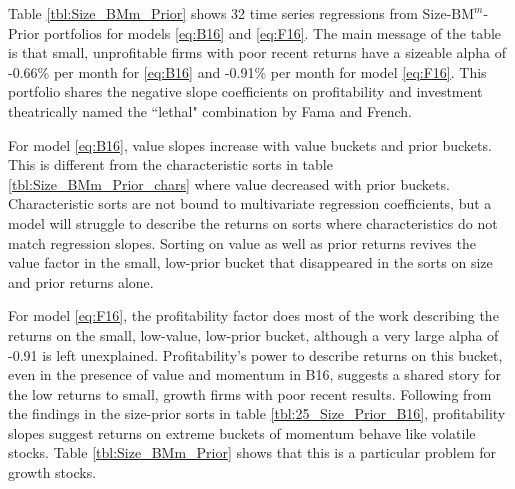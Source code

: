 
Table \ref{tbl:Size_BMm_Prior} shows 32 time series regressions from
Size-$\text{BM}^{m}$-Prior portfolios for models \ref{eq:B16} and \ref{eq:F16}.
The main message of the table is that small, unprofitable firms with poor
recent returns have a sizeable alpha of -0.66\% per month for \ref{eq:B16} and
-0.91\% per month for model \ref{eq:F16}. This portfolio shares the negative
slope coefficients on profitability and investment theatrically named the
``lethal" combination by Fama and French.

For model \ref{eq:B16}, value slopes increase with value buckets and prior
buckets. This is different from the characteristic sorts in table
\ref{tbl:Size_BMm_Prior_chars} where value decreased with prior buckets.
Characteristic sorts are not bound to multivariate regression coefficients, but
a model will struggle to describe the returns on sorts where characteristics do
not match regression slopes. Sorting on value as well as prior returns revives
the value factor in the small, low-prior bucket that disappeared in the sorts
on size and prior returns alone.

For model \ref{eq:F16}, the profitability factor does most of the work
describing the returns on the small, low-value, low-prior bucket, although a
very large alpha of -0.91 is left unexplained. Profitability's power to
describe returns on this bucket, even in the presence of value and momentum in
B16, suggests a shared story for the low returns to small, growth firms with
poor recent results. Following from the findings in the size-prior sorts in
table \ref{tbl:25_Size_Prior_B16}, profitability slopes suggest returns on
extreme buckets of momentum behave like volatile stocks. Table
\ref{tbl:Size_BMm_Prior} shows that this is a particular problem for growth
stocks.

